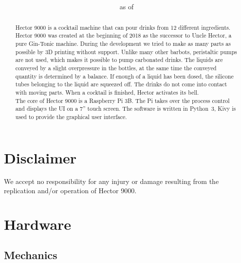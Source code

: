 \documentclass[a4paper]{scrartcl}
\title{ ~\\[2cm] {\Huge\tit} \\ {\aw}}
\author{\er}
\date{\small \DocNr{} as of \stand}
\begin{document}
\maketitle
\vspace*{\fill} %
\begin{abstract}
\noindent
Hector 9000 is a cocktail machine that can pour drinks from 12 different ingredients. Hector 9000 was created at the beginning of 2018 as the successor to Uncle Hector, a pure Gin-Tonic machine. During the development we tried to make as many parts as possible by 3D printing without support.
Unlike many other barbots, peristaltic pumps are not used, which makes it possible to pump carbonated drinks. The liquids are conveyed by a slight overpressure in the bottles, at the same time the conveyed quantity is determined by a balance. If enough of a liquid has been dosed, the silicone tubes belonging to the liquid are squeezed off. The drinks do not come into contact with moving parts. When a cocktail is finished, Hector activates its bell. \\
The core of Hector 9000 is a Raspberry Pi 3B. The Pi takes over the process control and displays the UI on a 7'' touch screen.
The software is written in Python~3, Kivy is used to provide the graphical user interface.
\end{abstract}


\FloatBarrier
\newpage

\tableofcontents
\newpage

\listoffigures

\listoftables
\newpage

\section{Disclaimer}
We accept no responsibility for any injury or damage resulting from the replication and/or operation of Hector 9000. 

\section{Hardware}
\subsection{Mechanics}
\end{document}
